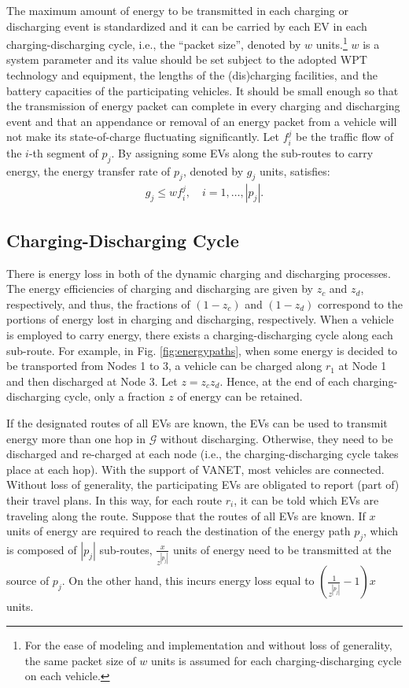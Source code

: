 \documentclass[journal]{IEEEtran}
\begin{document}
The maximum amount of energy to be transmitted in each charging or discharging event is standardized and it can be carried by each EV in each charging-discharging cycle, i.e., the ``packet size'', denoted by $w$ units.\footnote{For the ease of modeling and implementation and without loss of generality, the same packet size of $w$ units is assumed for each charging-discharging cycle on each vehicle.} $w$ is a system parameter and its value should be set subject to the adopted WPT technology and equipment, the lengths of the (dis)charging facilities, and the battery capacities of the participating vehicles. It should be small enough so that the transmission of energy packet can complete in every charging and discharging event and that an appendance or removal of an energy packet from a vehicle will not make its state-of-charge fluctuating significantly. Let $f_i^j$ be the traffic flow of the $i$-th segment of $p_j$. By assigning some EVs along the sub-routes to carry energy, the energy transfer rate of $p_j$,
denoted by $g_j$ units, satisfies:
\begin{align} \label{eq:rate}
			g_j \leq w f_i^j, \quad i=1,\ldots,|p_j|.
\end{align}


\subsection{Charging-Discharging Cycle}
There is energy loss in both of the dynamic charging and discharging processes. The energy efficiencies of charging and discharging are given by $z_c$ and $z_d$, respectively, and thus, the fractions of $(1-z_c)$ and $(1-z_d)$ correspond to the portions of energy lost in charging and discharging, respectively. When a vehicle is employed to carry energy, there exists a charging-discharging cycle along each sub-route. For example, in Fig. \ref{fig:energypaths}, when some energy is decided to be transported from Nodes 1 to 3,  a vehicle can be charged along $r_1$ at Node 1 and then discharged at Node 3. Let $z=z_cz_d$. Hence, at the end of each charging-discharging cycle, only a fraction $z$ of energy can be retained. 

If the designated routes of all EVs are known, the EVs can be used to transmit energy more than one hop in $\mathcal{G}$ without discharging. Otherwise,
they need to be discharged and re-charged at each node (i.e., the charging-discharging cycle takes place at each hop). With the support of VANET, most vehicles are connected. Without loss of generality, the participating EVs are obligated to report (part of) their travel plans. In this way, for each route $r_i$, it can be told which EVs are traveling along the route.  
Suppose that the routes of all EVs are known. If $x$ units of energy are required to reach the destination of the energy path $p_j$, which is composed of $|p_j|$ sub-routes, $\frac{x}{z^{|p_j|}}$ units of energy need to be transmitted at the source of $p_j$. On the other hand, this incurs energy loss equal to $(\frac{1}{z^{|p_j|}}-1)x$ units.
\end{document}
